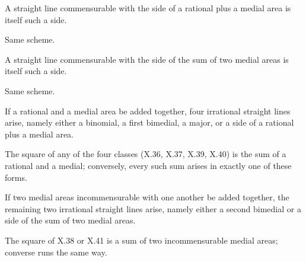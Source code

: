 \documentclass{rrxiv}
\begin{document}
\begin{claim}
\label{prop:X.69}
A straight line commensurable with the side of a rational plus a
medial area is itself such a side.
\end{claim}
\begin{evidence}[Proof of X.69]
\label{ev:X.69}
Same scheme.
\end{evidence}

\begin{claim}
\label{prop:X.70}
A straight line commensurable with the side of the sum of two medial
areas is itself such a side.
\end{claim}
\begin{evidence}[Proof of X.70]
\label{ev:X.70}
Same scheme.
\end{evidence}

\begin{claim}
\label{prop:X.71}
If a rational and a medial area be added together, four irrational
straight lines arise, namely either a binomial, a first bimedial, a
major, or a side of a rational plus a medial area.
\end{claim}
\begin{evidence}[Proof of X.71]
\label{ev:X.71}
The square of any of the four classes (X.36, X.37, X.39, X.40) is
the sum of a rational and a medial; conversely, every such sum
arises in exactly one of these forms.
\end{evidence}

\begin{claim}
\label{prop:X.72}
If two medial areas incommensurable with one another be added
together, the remaining two irrational straight lines arise, namely
either a second bimedial or a side of the sum of two medial areas.
\end{claim}
\begin{evidence}[Proof of X.72]
\label{ev:X.72}
The square of X.38 or X.41 is a sum of two incommensurable medial
areas; converse runs the same way.
\end{evidence}
\end{document}
